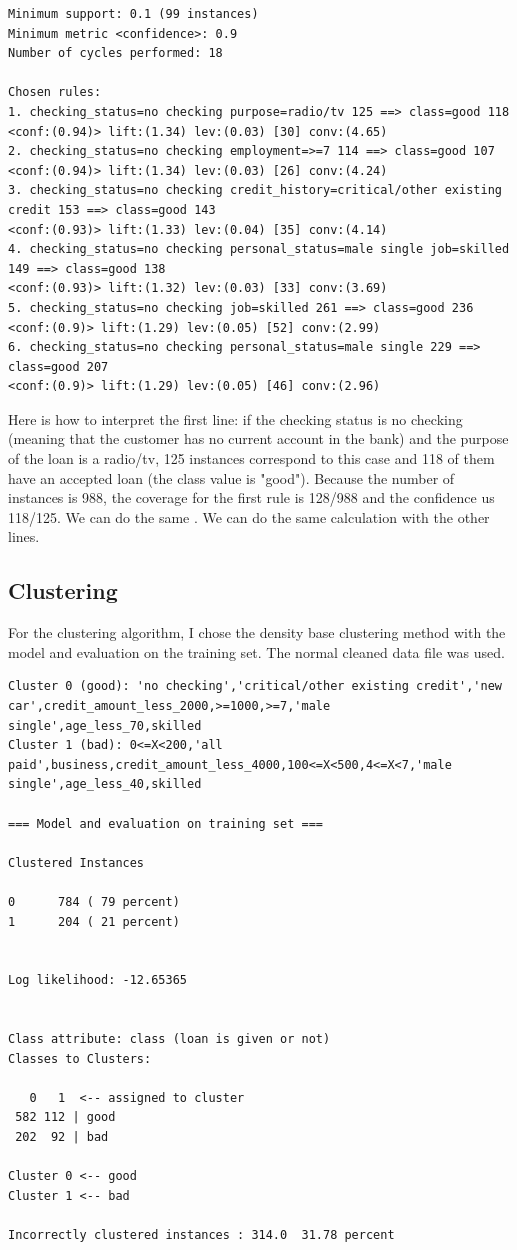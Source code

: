 \documentclass[12pt, a4paper]{article}
\begin{document}
\begin{lstlisting}[caption = Apriori results]
Minimum support: 0.1 (99 instances)
Minimum metric <confidence>: 0.9
Number of cycles performed: 18

Chosen rules:
1. checking_status=no checking purpose=radio/tv 125 ==> class=good 118    
<conf:(0.94)> lift:(1.34) lev:(0.03) [30] conv:(4.65)
2. checking_status=no checking employment=>=7 114 ==> class=good 107    
<conf:(0.94)> lift:(1.34) lev:(0.03) [26] conv:(4.24)
3. checking_status=no checking credit_history=critical/other existing credit 153 ==> class=good 143    
<conf:(0.93)> lift:(1.33) lev:(0.04) [35] conv:(4.14)
4. checking_status=no checking personal_status=male single job=skilled 149 ==> class=good 138    
<conf:(0.93)> lift:(1.32) lev:(0.03) [33] conv:(3.69)
5. checking_status=no checking job=skilled 261 ==> class=good 236    
<conf:(0.9)> lift:(1.29) lev:(0.05) [52] conv:(2.99)
6. checking_status=no checking personal_status=male single 229 ==> class=good 207    
<conf:(0.9)> lift:(1.29) lev:(0.05) [46] conv:(2.96)
\end{lstlisting}

Here is how to interpret the first line: if the checking status is no checking (meaning that the customer has no current account in the bank) and the purpose of the loan is a radio/tv, 125 instances correspond to this case and 118 of them have an accepted loan (the class value is "good").
Because the number of instances is 988, the coverage for the first rule is 128/988 and the confidence us 118/125.
We can do the same . We can do the same calculation with the other lines.
\subsection{Clustering}
For the clustering algorithm, I chose the density base clustering method with the model and evaluation on the training set. The normal cleaned data file was used.

\begin{lstlisting}[caption = Clustering results]
Cluster 0 (good): 'no checking','critical/other existing credit','new car',credit_amount_less_2000,>=1000,>=7,'male single',age_less_70,skilled
Cluster 1 (bad): 0<=X<200,'all paid',business,credit_amount_less_4000,100<=X<500,4<=X<7,'male single',age_less_40,skilled

=== Model and evaluation on training set ===

Clustered Instances

0      784 ( 79 percent)
1      204 ( 21 percent)


Log likelihood: -12.65365


Class attribute: class (loan is given or not)
Classes to Clusters:

   0   1  <-- assigned to cluster
 582 112 | good
 202  92 | bad

Cluster 0 <-- good
Cluster 1 <-- bad

Incorrectly clustered instances : 314.0  31.78 percent
\end{lstlisting}
\end{document}

